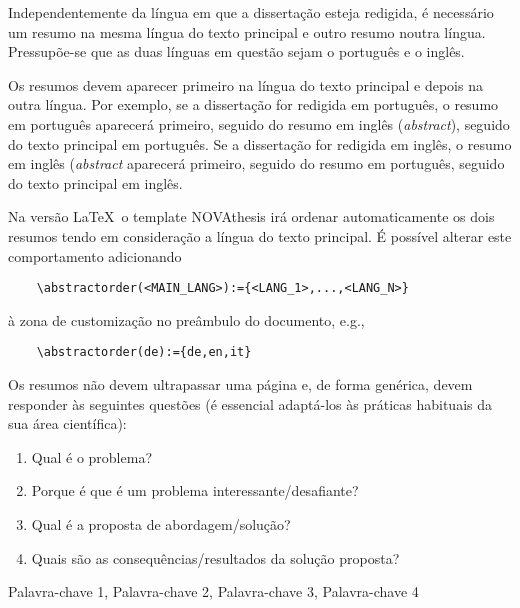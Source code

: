 
%

Independentemente da língua em que a dissertação esteja redigida, é necessário um resumo na mesma língua do texto principal e outro resumo noutra língua. Pressupõe-se que as duas línguas em questão sejam o português e o inglês.

Os resumos devem aparecer primeiro na língua do texto principal e depois na outra língua. Por exemplo, se a dissertação for redigida em português, o resumo em português aparecerá primeiro, seguido do resumo em inglês (\emph{abstract}), seguido do texto principal em português. Se a dissertação for redigida em inglês, o resumo em inglês (\emph{abstract} aparecerá primeiro, seguido do resumo em português, seguido do texto principal em inglês.

Na versão \LaTeX\, o template NOVAthesis irá ordenar automaticamente os dois resumos tendo em consideração a língua do texto principal. É possível alterar este comportamento adicionando
\begin{verbatim}
    \abstractorder(<MAIN_LANG>):={<LANG_1>,...,<LANG_N>}
\end{verbatim}
\noindent à zona de customização no preâmbulo do documento, e.g.,
\begin{verbatim}
    \abstractorder(de):={de,en,it}
\end{verbatim}

Os resumos não devem ultrapassar uma página e, de forma genérica, devem responder às seguintes questões (é essencial adaptá-los às práticas habituais da sua área científica):

\begin{enumerate}
  \item Qual é o problema?
  \item Porque é que é um problema interessante/desafiante?
  \item Qual é a proposta de abordagem/solução?
  \item Quais são as consequências/resultados da solução proposta?
\end{enumerate}

%
%

\begin{keywords}
Palavra-chave 1, Palavra-chave 2, Palavra-chave 3, Palavra-chave 4
\end{keywords}
